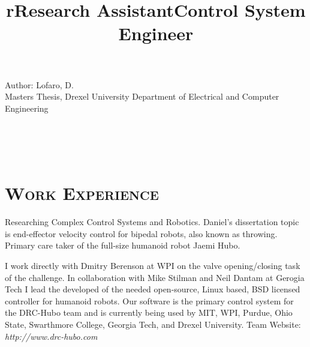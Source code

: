 \begin{resume}
\begin{position}
Author: Lofaro, D. \\
Masters Thesis, Drexel University Department of Electrical and Computer Engineering
\end{position}





\begin{formatb}  
  \title{r}\\
  \\
  \body\\
\end{formatb}




\section{\textsc{Work Experience}}

\title{Research Assistant}
\begin{position}
Researching Complex Control Systems and Robotics. Daniel's dissertation topic is end-effector velocity control for bipedal robots, also known as throwing.  Primary care taker of the full-size humanoid robot Jaemi Hubo.
\end{position}


\title{Control System Engineer}
\begin{position}
I work directly with Dmitry Berenson at WPI on the valve opening/closing task of the challenge. 
In collaboration with Mike Stilman and Neil Dantam at Gerogia Tech I lead the developed of the needed open-source, Linux based, BSD licensed controller for humanoid robots. 
Our software is the primary control system for the DRC-Hubo team and is currently being used by MIT, WPI, Purdue, Ohio State, Swarthmore College, Georgia Tech, and Drexel University. 
Team Website: \textit{http://www.drc-hubo.com}
\end{position}




\end{resume}
